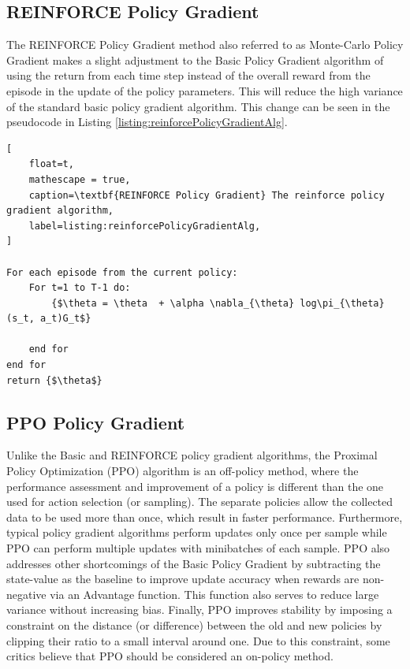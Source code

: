 \documentclass[conference]{IEEEtran}
\begin{document}
\subsection{REINFORCE Policy Gradient}
The REINFORCE Policy Gradient method also referred to as Monte-Carlo Policy Gradient makes a slight adjustment to the Basic Policy Gradient algorithm of using the return from each time step instead of the overall reward from the episode in the update of the policy parameters. This will reduce the high variance of the standard basic policy gradient algorithm.
This change can be seen in the pseudocode in Listing \ref{listing:reinforcePolicyGradientAlg}. 

\begin{lstlisting}[
    float=t,
    mathescape = true,
    caption=\textbf{REINFORCE Policy Gradient} The reinforce policy gradient algorithm,
    label=listing:reinforcePolicyGradientAlg,
]

For each episode from the current policy:
    For t=1 to T-1 do:
        {$\theta = \theta  + \alpha \nabla_{\theta} log\pi_{\theta}(s_t, a_t)G_t$}

    end for
end for
return {$\theta$}
\end{lstlisting}

\subsection{PPO Policy Gradient}
Unlike the Basic and REINFORCE policy gradient algorithms, the Proximal Policy Optimization (PPO) algorithm is an off-policy method, where the performance assessment and improvement of a policy is different than the one used for action selection (or sampling). The separate policies allow the collected data to be used more than once, which result in faster performance. Furthermore, typical policy gradient algorithms perform updates only once per sample while PPO can perform multiple updates with minibatches of each sample. PPO also addresses other shortcomings of the Basic Policy Gradient by subtracting the state-value as the baseline to improve update accuracy when rewards are non-negative via an Advantage function. This function also serves to reduce large variance without increasing bias. Finally, PPO improves stability by imposing a constraint on the distance (or difference) between the old and new policies by clipping their ratio to a small interval around one. Due to this constraint, some critics believe that PPO should be considered an on-policy method.
\end{document}
